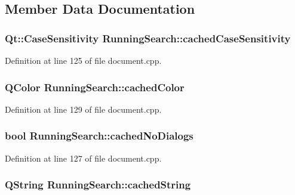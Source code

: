 \subsection{Member Data Documentation}
\hypertarget{structRunningSearch_a18e388eb59284584e8bd1f514ef7eaf5}{
\subsubsection[{cached\+Case\+Sensitivity}]{\setlength{\rightskip}{0pt plus 5cm}Qt\+::\+Case\+Sensitivity Running\+Search\+::cached\+Case\+Sensitivity}}\label{structRunningSearch_a18e388eb59284584e8bd1f514ef7eaf5}


Definition at line 125 of file document.\+cpp.

\hypertarget{structRunningSearch_ab49ca5b36bab91976e99620b0701fffe}{
\subsubsection[{cached\+Color}]{\setlength{\rightskip}{0pt plus 5cm}Q\+Color Running\+Search\+::cached\+Color}}\label{structRunningSearch_ab49ca5b36bab91976e99620b0701fffe}


Definition at line 129 of file document.\+cpp.

\hypertarget{structRunningSearch_a407eed15ba7e4e73db19b37bda4cf4c1}{
\subsubsection[{cached\+No\+Dialogs}]{\setlength{\rightskip}{0pt plus 5cm}bool Running\+Search\+::cached\+No\+Dialogs}}\label{structRunningSearch_a407eed15ba7e4e73db19b37bda4cf4c1}


Definition at line 127 of file document.\+cpp.

\hypertarget{structRunningSearch_aeed5bd658d162c7650b2e4cb315df054}{
\subsubsection[{cached\+String}]{\setlength{\rightskip}{0pt plus 5cm}Q\+String Running\+Search\+::cached\+String}}\label{structRunningSearch_aeed5bd658d162c7650b2e4cb315df054}


